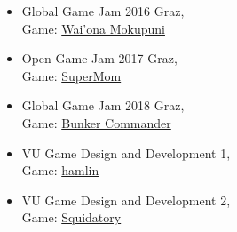 
\begin{itemize}
  \item Global Game Jam 2016 Graz, \\ Game: \href{https://globalgamejam.org/2016/games/waiona-mokupuni}{Wai'ona Mokupuni}
  \item Open Game Jam 2017 Graz, \\ Game: \href{https://chackchakguy.itch.io/supermom}{SuperMom}
  \item Global Game Jam 2018 Graz, \\ Game: \href{https://globalgamejam.org/2018/games/bunker-commander}{Bunker Commander}
  \item VU Game Design and Development 1, \\ Game: \href{https://cworld91.itch.io/hamlin}{hamlin} 
  \item VU Game Design and Development 2, \\ Game: \href{https://cworld91.itch.io/squidatory}{Squidatory}
\end{itemize}